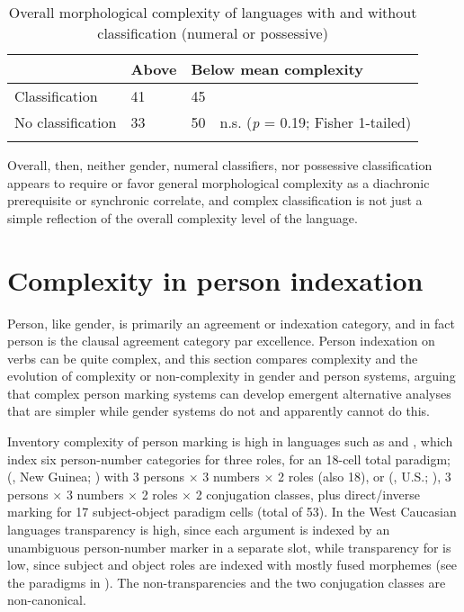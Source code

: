 \documentclass[output=collectionpaper]{langsci/langscibook}
\begin{document}
\begin{table}
\caption{Overall morphological complexity of languages with and without classification (numeral or possessive)}
\label{extab:Nich:15}

\begin{tabularx}{\textwidth}{p{2.7cm}Xp{1.3cm}l}
\lsptoprule
				 &Above 	 &	\multicolumn{2}{l}{Below mean complexity} \\
			 \midrule
	Classification		 &41	 &	45 \\
	No classification	 &33	 &	50 &	n.s.  (\textit{p} = 0.19; Fisher 1-tailed) \\
\lspbottomrule\end{tabularx}
\end{table}

Overall, then, neither gender, numeral classifiers, nor possessive classification appears to require or favor general morphological complexity as a diachronic prerequisite or synchronic correlate, and complex classification is not just a simple reflection of the overall complexity level of the language.




\section{Complexity in person indexation}
\label{sec:Nich:5}

Person, like gender, is primarily an agreement or indexation category, and in fact person is the clausal agreement category par excellence. Person indexation on verbs can be quite complex, and this section compares complexity and the evolution of complexity or non-complexity in gender and person systems, arguing that complex person marking systems can develop emergent alternative analyses that are simpler while gender systems do not and apparently cannot do this.

Inventory complexity of person marking is high in  languages such as  and , which index six person-number categories for three roles, for an 18-cell total paradigm;  (, New Guinea; \citealt{Foley1991}) with 3 persons $\times$ 3 numbers $\times$ 2 roles (also 18), or  (, U.S.; \citealt{Watkins1984}), 3 persons $\times$ 3 numbers $\times$ 2 roles $\times$ 2 conjugation classes, plus direct/inverse marking for 17 subject-object paradigm cells (total of 53). In the West Caucasian languages transparency is high, since each argument is indexed by an unambiguous person-number marker in a separate slot, while transparency for  is low, since subject and object roles are indexed with mostly fused morphemes (see the paradigms in \citealt[115--116]{Watkins1984}). The  non-transparencies and the two conjugation classes are non-canonical.
\end{document}
